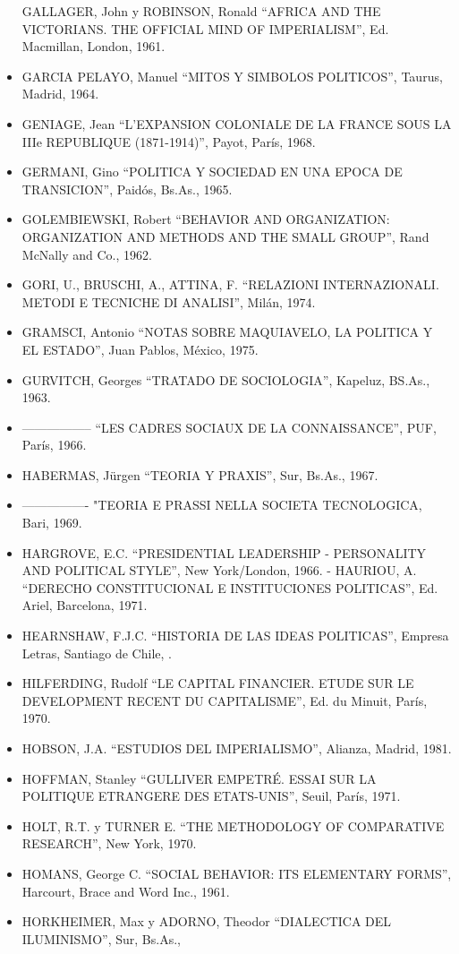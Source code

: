 \documentclass[
]{book}
\begin{document}
\begin{itemize}
  GALLAGER, John y ROBINSON, Ronald ``AFRICA AND THE VICTORIANS. THE OFFICIAL
  MIND OF IMPERIALISM'', Ed. Macmillan, London, 1961.
\item
  GARCIA PELAYO, Manuel ``MITOS Y SIMBOLOS POLITICOS'', Taurus, Madrid, 1964.
\item
  GENIAGE, Jean ``L'EXPANSION COLONIALE DE LA FRANCE SOUS LA IIIe REPUBLIQUE
  (1871-1914)'', Payot, París, 1968.
\item
  GERMANI, Gino ``POLITICA Y SOCIEDAD EN UNA EPOCA DE TRANSICION'', Paidós,
  Bs.As., 1965.
\item
  GOLEMBIEWSKI, Robert ``BEHAVIOR AND ORGANIZATION: ORGANIZATION AND
  METHODS AND THE SMALL GROUP'', Rand McNally and Co., 1962.
\item
  GORI, U., BRUSCHI, A., ATTINA, F. ``RELAZIONI INTERNAZIONALI. METODI E TECNICHE
  DI ANALISI'', Milán, 1974.
\item
  GRAMSCI, Antonio ``NOTAS SOBRE MAQUIAVELO, LA POLITICA Y EL ESTADO'', Juan
  Pablos, México, 1975.
\item
  GURVITCH, Georges ``TRATADO DE SOCIOLOGIA'', Kapeluz, BS.As., 1963.
\item
  ----------------- ``LES CADRES SOCIAUX DE LA CONNAISSANCE'', PUF, París, 1966.
\item
  HABERMAS, Jürgen ``TEORIA Y PRAXIS'', Sur, Bs.As., 1967.
\item
  ---------------- "TEORIA E PRASSI NELLA SOCIETA TECNOLOGICA, Bari, 1969.
\item
  HARGROVE, E.C. ``PRESIDENTIAL LEADERSHIP - PERSONALITY AND POLITICAL
  STYLE'', New York/London, 1966. - HAURIOU, A. ``DERECHO CONSTITUCIONAL E INSTITUCIONES POLITICAS'', Ed. Ariel,
  Barcelona, 1971.
\item
  HEARNSHAW, F.J.C. ``HISTORIA DE LAS IDEAS POLITICAS'', Empresa Letras, Santiago de
  Chile, .
\item
  HILFERDING, Rudolf ``LE CAPITAL FINANCIER. ETUDE SUR LE DEVELOPMENT RECENT
  DU CAPITALISME'', Ed. du Minuit, París, 1970.
\item
  HOBSON, J.A. ``ESTUDIOS DEL IMPERIALISMO'', Alianza, Madrid, 1981.
\item
  HOFFMAN, Stanley ``GULLIVER EMPETRÉ. ESSAI SUR LA POLITIQUE ETRANGERE DES
  ETATS-UNIS'', Seuil, París, 1971.
\item
  HOLT, R.T. y TURNER E. ``THE METHODOLOGY OF COMPARATIVE RESEARCH'', New
  York, 1970.
\item
  HOMANS, George C. ``SOCIAL BEHAVIOR: ITS ELEMENTARY FORMS'', Harcourt, Brace and
  Word Inc., 1961.
\item
  HORKHEIMER, Max y ADORNO, Theodor ``DIALECTICA DEL ILUMINISMO'', Sur, Bs.As.,
\end{itemize}
\end{document}
